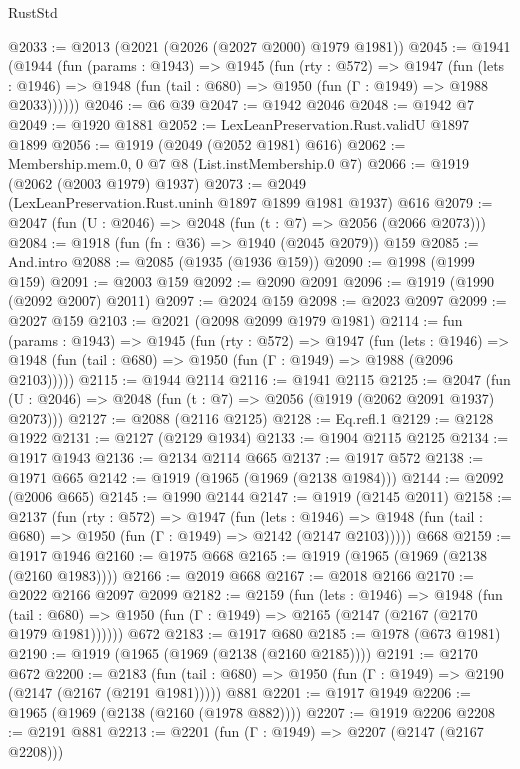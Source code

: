 \begin{lexlean}{RustStd}
\begin{coremodule}
@2033 := @2013 (@2021 (@2026 (@2027 @2000) @1979 @1981))
@2045 := @1941
    (@1944
      (fun (params : @1943) =>
      @1945
        (fun (rty : @572) =>
        @1947
          (fun (lets : @1946) =>
          @1948 (fun (tail : @680) => @1950 (fun (Γ : @1949) => @1988 @2033))))))
@2046 := @6 @39
@2047 := @1942 @2046
@2048 := @1942 @7
@2049 := @1920 @1881
@2052 := LexLeanPreservation.Rust.validU @1897 @1899
@2056 := @1919 (@2049 (@2052 @1981) @616)
@2062 := Membership.mem.{0, 0} @7 @8 (List.instMembership.{0} @7)
@2066 := @1919 (@2062 (@2003 @1979) @1937)
@2073 := @2049 (LexLeanPreservation.Rust.uninh @1897 @1899 @1981 @1937) @616
@2079 := @2047 (fun (U : @2046) => @2048 (fun (t : @7) => @2056 (@2066 @2073)))
@2084 := @1918 (fun (fn : @36) => @1940 (@2045 @2079)) @159
@2085 := And.intro
@2088 := @2085 (@1935 (@1936 @159))
@2090 := @1998 (@1999 @159)
@2091 := @2003 @159
@2092 := @2090 @2091
@2096 := @1919 (@1990 (@2092 @2007) @2011)
@2097 := @2024 @159
@2098 := @2023 @2097
@2099 := @2027 @159
@2103 := @2021 (@2098 @2099 @1979 @1981)
@2114 := fun (params : @1943) =>
  @1945
    (fun (rty : @572) =>
    @1947
      (fun (lets : @1946) =>
      @1948 (fun (tail : @680) => @1950 (fun (Γ : @1949) => @1988 (@2096 @2103)))))
@2115 := @1944 @2114
@2116 := @1941 @2115
@2125 := @2047 (fun (U : @2046) => @2048 (fun (t : @7) => @2056 (@1919 (@2062 @2091 @1937) @2073)))
@2127 := @2088 (@2116 @2125)
@2128 := Eq.refl.{1}
@2129 := @2128 @1922
@2131 := @2127 (@2129 @1934)
@2133 := @1904 @2115 @2125
@2134 := @1917 @1943
@2136 := @2134 @2114 @665
@2137 := @1917 @572
@2138 := @1971 @665
@2142 := @1919 (@1965 (@1969 (@2138 @1984)))
@2144 := @2092 (@2006 @665)
@2145 := @1990 @2144
@2147 := @1919 (@2145 @2011)
@2158 := @2137
    (fun (rty : @572) =>
    @1947
      (fun (lets : @1946) =>
      @1948 (fun (tail : @680) => @1950 (fun (Γ : @1949) => @2142 (@2147 @2103)))))
    @668
@2159 := @1917 @1946
@2160 := @1975 @668
@2165 := @1919 (@1965 (@1969 (@2138 (@2160 @1983))))
@2166 := @2019 @668
@2167 := @2018 @2166
@2170 := @2022 @2166 @2097 @2099
@2182 := @2159
    (fun (lets : @1946) =>
    @1948
      (fun (tail : @680) => @1950 (fun (Γ : @1949) => @2165 (@2147 (@2167 (@2170 @1979 @1981))))))
    @672
@2183 := @1917 @680
@2185 := @1978 (@673 @1981)
@2190 := @1919 (@1965 (@1969 (@2138 (@2160 @2185))))
@2191 := @2170 @672
@2200 := @2183
    (fun (tail : @680) => @1950 (fun (Γ : @1949) => @2190 (@2147 (@2167 (@2191 @1981)))))
    @881
@2201 := @1917 @1949
@2206 := @1965 (@1969 (@2138 (@2160 (@1978 @882))))
@2207 := @1919 @2206
@2208 := @2191 @881
@2213 := @2201 (fun (Γ : @1949) => @2207 (@2147 (@2167 @2208)))

\end{coremodule}
\end{lexlean}
